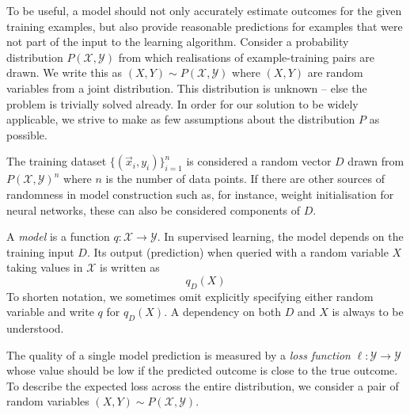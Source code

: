 \documentclass[
	twoside=false, %
]{kaobook}
\begin{document}
To be useful, a model should not only accurately estimate outcomes for the given training examples, but also provide reasonable predictions for examples that were not part of the input to the learning algorithm. 
Consider a probability distribution $P(\mathcal{X}, \mathcal{Y})$ from which realisations of example-training pairs are drawn. We write this as $(X, Y) \sim P(\mathcal{X}, \mathcal{Y})$ where $(X,Y)$ are random variables from a joint distribution.
This distribution is unknown -- else the problem is trivially solved already. In order for our solution to be widely applicable, we strive to make as few assumptions about the distribution $P$ as possible. 

The training dataset $\{ (\vec{x}_{i}, y_{i}) \}_{i=1}^n$ is considered a random vector $D$ drawn from $P(\mathcal{X}, \mathcal{Y})^n$ where $n$ is the number of data points. If there are other sources of randomness in model construction such as, for instance, weight initialisation for neural networks, these can also be considered components of $D$.

\begin{definition}
A \textit{model} is a function $q: \mathcal{X} \to \mathcal{Y}$. In supervised learning, the model depends on the training input $D$. Its output (prediction) when queried with a random variable $X$ taking values in $\mathcal{X}$ is written as
$$
q_{D}(X)
$$
To shorten notation, we sometimes omit explicitly specifying either random variable and write $q$ for $q_D(X)$. A dependency on both $D$ and $X$ is always to be understood.
\end{definition}


%
The quality of a single model prediction is measured by a \textit{loss function} $\ell: \mathcal{Y} \to \mathcal{Y}$ whose value should be low if the predicted outcome is close to the true outcome. 
To describe the expected loss across the entire distribution, we consider a pair of random variables $(X,Y) \sim P(\mathcal{X}, \mathcal{Y})$. 
\end{document}
